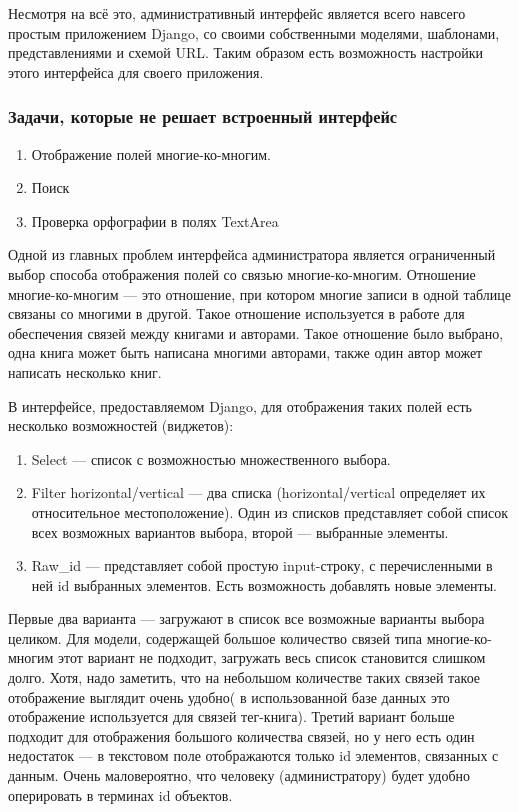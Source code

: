 \documentclass[a4paper]{report}
\begin{document}
Несмотря на всё это, административный интерфейс является всего навсего простым приложением Django, со своими собственными моделями, шаблонами, представлениями и схемой URL. Таким образом есть возможность настройки этого интерфейса для своего приложения.

\subsubsection{Задачи, которые не решает встроенный интерфейс}
\begin{enumerate}
	\item Отображение полей многие-ко-многим.
	\item Поиск
	\item Проверка орфографии в полях TextArea
\end{enumerate}

Одной из главных проблем интерфейса администратора является ограниченный выбор способа отображения полей со связью многие-ко-многим. Отношение многие-ко-многим  --- это отношение, при котором многие записи в одной таблице связаны со многими в другой. Такое отношение используется в работе для обеспечения связей между книгами и авторами. Такое отношение было выбрано, \tk одна книга может быть написана многими авторами, также один автор может написать несколько книг. 

В интерфейсе, предоставляемом Django, для отображения таких полей есть несколько возможностей (виджетов):
\begin{enumerate}
	\item Select --- список с возможностью множественного выбора.
	\item Filter horizontal/vertical --- два списка (horizontal/vertical определяет их относительное местоположение). Один из списков представляет собой список всех возможных вариантов выбора, второй --- выбранные элементы.
	\item Raw\_id --- представляет собой простую input-строку, с перечисленными в ней id выбранных элементов. Есть возможность добавлять новые элементы.
\end{enumerate}
Первые два варианта --- загружают в список все возможные варианты выбора целиком. Для модели, содержащей большое количество связей типа многие-ко-многим этот вариант не подходит, \tk загружать весь список становится слишком долго. Хотя, надо заметить, что на небольшом количестве таких связей такое отображение выглядит очень удобно( в использованной базе данных это отображение используется для связей тег-книга). 
Третий вариант больше подходит для отображения большого количества связей, но у него есть один недостаток --- в текстовом поле отображаются только id элементов, связанных с данным. Очень маловероятно, что человеку (администратору) будет удобно оперировать в терминах id объектов.
\end{document}
